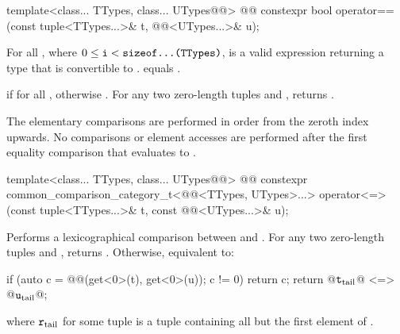 \documentclass{wg21}
\begin{document}
\begin{itemdecl}
template<class... TTypes, class... UTypes@@>
@@
constexpr bool operator==(const tuple<TTypes...>& t, @@<UTypes...>& u);
\end{itemdecl}

\begin{itemdescr}
    \pnum
    \mandates
    For all ,
    where $0 \leq \texttt{i} < \texttt{sizeof...(TTypes)}$,
     is a valid expression
    returning a type that is convertible to .
     equals
    .
    
    \pnum
    \returns
     if  for all
    , otherwise .
    For any two zero-length tuples  and ,  returns .
    
    \pnum
    \effects
    The elementary comparisons are performed in order from the
    zeroth index upwards.  No comparisons or element accesses are
    performed after the first equality comparison that evaluates to
    .
\end{itemdescr}

%
\begin{itemdecl}
template<class... TTypes, class... UTypes@@>
@@
constexpr common_comparison_category_t<@@<TTypes, UTypes>...>
operator<=>(const tuple<TTypes...>& t, const @@<UTypes...>& u);
\end{itemdecl}

\begin{itemdescr}
    \pnum
    \effects
    Performs a lexicographical comparison between  and .
    For any two zero-length tuples  and ,
     returns .
    Otherwise, equivalent to:
    \begin{codeblock}
        if (auto c = @@(get<0>(t), get<0>(u)); c != 0) return c;
        return @$\texttt{t}_\mathrm{tail}$@ <=> @$\texttt{u}_\mathrm{tail}$@;
    \end{codeblock}
    where $\texttt{r}_\mathrm{tail}$ for some tuple 
    is a tuple containing all but the first element of .
\end{itemdescr}
\end{document}
